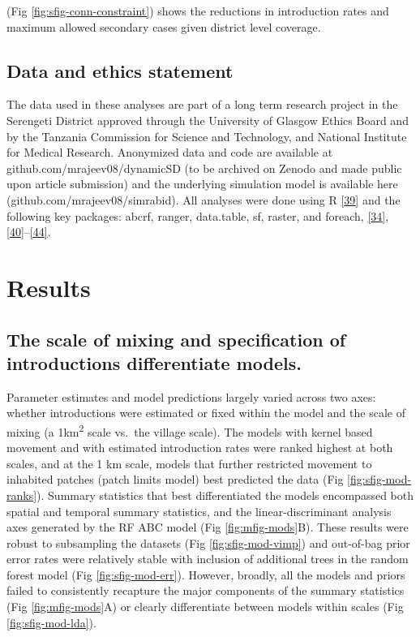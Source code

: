 \documentclass[
  oneside]{book}
\begin{document}
(Fig \ref{fig:sfig-conn-constraint}) shows the reductions in introduction rates and maximum allowed secondary cases given district level coverage.

\hypertarget{data-and-ethics-statement}{%
\subsection{Data and ethics statement}\label{data-and-ethics-statement}}

The data used in these analyses are part of a long term research project in the Serengeti District approved through the University of Glasgow Ethics Board and by the Tanzania Commission for Science and Technology, and National Institute for Medical Research. Anonymized data and code are available at github.com/mrajeev08/dynamicSD (to be archived on Zenodo and made public upon article submission) and the underlying simulation model is available here (github.com/mrajeev08/simrabid). All analyses were done using R \protect\hyperlink{ref-R-program}{{[}39{]}} and the following key packages: abcrf, ranger, data.table, sf, raster, and foreach, \protect\hyperlink{ref-pudlo2015}{{[}34{]}}, \protect\hyperlink{ref-R-sf}{{[}40{]}}--\protect\hyperlink{ref-R-foreach}{{[}44{]}}.

\hypertarget{results-2}{%
\section{Results}\label{results-2}}

\hypertarget{the-scale-of-mixing-and-specification-of-introductions-differentiate-models.}{%
\subsection{The scale of mixing and specification of introductions differentiate models.}\label{the-scale-of-mixing-and-specification-of-introductions-differentiate-models.}}

Parameter estimates and model predictions largely varied across two axes: whether introductions were estimated or fixed within the model and the scale of mixing (a 1km\textsuperscript{2} scale vs.~the village scale). The models with kernel based movement and with estimated introduction rates were ranked highest at both scales, and at the 1 km scale, models that further restricted movement to inhabited patches (patch limits model) best predicted the data (Fig \ref{fig:sfig-mod-ranks}). Summary statistics that best differentiated the models encompassed both spatial and temporal summary statistics, and the linear-discriminant analysis axes generated by the RF ABC model (Fig \ref{fig:mfig-mods}B). These results were robust to subsampling the datasets (Fig \ref{fig:sfig-mod-vimp}) and out-of-bag prior error rates were relatively stable with inclusion of additional trees in the random forest model (Fig \ref{fig:sfig-mod-err}). However, broadly, all the models and priors failed to consistently recapture the major components of the summary statistics (Fig \ref{fig:mfig-mods}A) or clearly differentiate between models within scales (Fig \ref{fig:sfig-mod-lda}).
\end{document}
